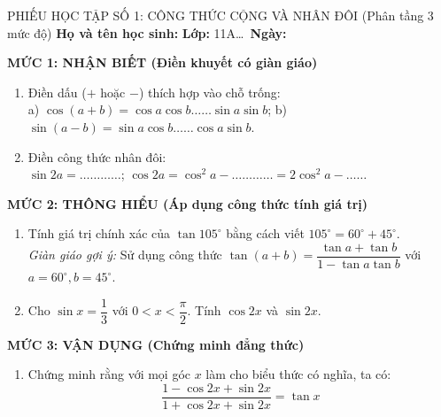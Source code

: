 \documentclass[12pt, a4paper]{article}
\begin{document}
\begin{pedabox}{PHIẾU HỌC TẬP SỐ 1: CÔNG THỨC CỘNG VÀ NHÂN ĐÔI (Phân tầng 3 mức độ)}
\textbf{Họ và tên học sinh:} \dotfill \textbf{Lớp:} 11A\dots \ \textbf{Ngày:} \dotfill

\textbf{MỨC 1: NHẬN BIẾT (Điền khuyết có giàn giáo)}
\begin{enumerate}[leftmargin=0.5cm]
    \item Điền dấu ($+$ hoặc $-$) thích hợp vào chỗ trống:\\
    a) $\cos(a + b) = \cos a \cos b \dots\dots \sin a \sin b$; \quad b) $\sin(a - b) = \sin a \cos b \dots\dots \cos a \sin b$.
    \item Điền công thức nhân đôi:\\
    $\sin 2a = \dots\dots\dots\dots$; \quad $\cos 2a = \cos^2 a - \dots\dots\dots\dots = 2\cos^2 a - \dots\dots$
\end{enumerate}

\textbf{MỨC 2: THÔNG HIỂU (Áp dụng công thức tính giá trị)}
\begin{enumerate}[leftmargin=0.5cm]
    \item Tính giá trị chính xác của $\tan 105^\circ$ bằng cách viết $105^\circ = 60^\circ + 45^\circ$.\\
    \textit{Giàn giáo gợi ý:} Sử dụng công thức $\tan(a + b) = \dfrac{\tan a + \tan b}{1 - \tan a \tan b}$ với $a = 60^\circ, b = 45^\circ$.
    \item Cho $\sin x = \dfrac{1}{3}$ với $0 < x < \dfrac{\pi}{2}$. Tính $\cos 2x$ và $\sin 2x$.
\end{enumerate}

\textbf{MỨC 3: VẬN DỤNG (Chứng minh đẳng thức)}
\begin{enumerate}[leftmargin=0.5cm]
    \item Chứng minh rằng với mọi góc $x$ làm cho biểu thức có nghĩa, ta có:
    $$\dfrac{1 - \cos 2x + \sin 2x}{1 + \cos 2x + \sin 2x} = \tan x$$
\end{enumerate}
\end{pedabox}

\vspace{8pt}
\end{document}
